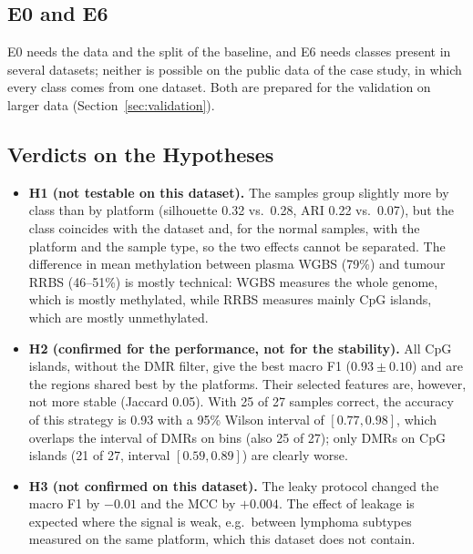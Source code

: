 \documentclass[runningheads]{llncs}
\begin{document}
\subsection{E0 and E6}
E0 needs the data and the split of the baseline, and E6 needs classes present in several datasets; neither is possible on the public data of the case study, in which every class comes from one dataset. Both are prepared for the validation on larger data (Section~\ref{sec:validation}).


\subsection{Verdicts on the Hypotheses}
\begin{itemize}
\item \textbf{H1 (not testable on this dataset).} The samples group slightly more by class than by platform (silhouette 0.32 vs.\ 0.28, ARI 0.22 vs.\ 0.07), but the class coincides with the dataset and, for the normal samples, with the platform and the sample type, so the two effects cannot be separated. The difference in mean methylation between plasma WGBS (79\%) and tumour RRBS (46--51\%) is mostly technical: WGBS measures the whole genome, which is mostly methylated, while RRBS measures mainly CpG islands, which are mostly unmethylated.
\item \textbf{H2 (confirmed for the performance, not for the stability).} All CpG islands, without the DMR filter, give the best macro F1 ($0.93\pm0.10$) and are the regions shared best by the platforms. Their selected features are, however, not more stable (Jaccard 0.05). With 25 of 27 samples correct, the accuracy of this strategy is 0.93 with a 95\% Wilson interval of $[0.77, 0.98]$, which overlaps the interval of DMRs on bins (also 25 of 27); only DMRs on CpG islands (21 of 27, interval $[0.59, 0.89]$) are clearly worse.
\item \textbf{H3 (not confirmed on this dataset).} The leaky protocol changed the macro F1 by $-0.01$ and the MCC by $+0.004$. The effect of leakage is expected where the signal is weak, e.g.\ between lymphoma subtypes measured on the same platform, which this dataset does not contain.
\end{itemize}
\end{document}
